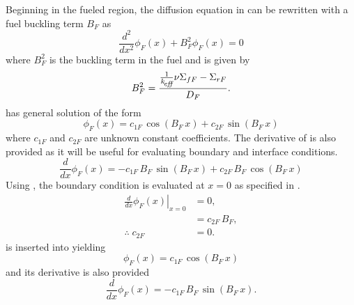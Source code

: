  Beginning in the fueled region, the diffusion equation in  can 
  be rewritten with a fuel buckling term $B_F$ as
  \begin{equation}
    \label{eq:2regF_buckle}
    \frac{d^2}{dx^2} \phi_F(x) + B_F^2 \phi_F(x) = 0 
  \end{equation}
  where $B_F^2$ is the buckling term in the fuel and is given by
  \begin{equation}
    \label{eq:2regF_b2}
    B_F^2 = \frac{\frac{1}{k_{\!\mbox{\scriptsize \em eff}}} \nu \Sigma_{fF} - \Sigma_{rF}}{D_F}.
  \end{equation}
   has general solution of the form
  \begin{equation}
    \label{eq:2regF_general}
    \phi_F(x) = c_{1F} \, \cos(B_F\,x) + c_{2F} \, \sin(B_F\,x)
  \end{equation}
  where $c_{1F}$ and $c_{2F}$ are unknown constant coefficients.
  The derivative of  is also provided as it will be
  useful for evaluating boundary and interface conditions.
  \begin{equation}
    \label{eq:2regF_general_derivative}
    \frac{d}{dx}\phi_F(x) = -c_{1F} \, B_F \, \sin(B_F\,x) + 
      c_{2F} \, B_F \, \cos(B_F\,x)
  \end{equation}
  Using , the boundary condition is evaluated
  at $x=0$ as specified in .
  \begin{align}
    \left. \frac{d}{dx} \phi_F(x) \right|_{x=0} &= 0, \\
    &= c_{2F} \, B_F, \\
    \label{eq:2reg_c2f}
    \therefore \; c_{2F} &= 0.
  \end{align}
   is inserted into  yielding
  \begin{equation}
    \label{eq:2regF_cos}
    \phi_F(x) = c_{1F} \, \cos(B_F\, x)
  \end{equation}
  and its derivative is also provided
  \begin{equation}
    \label{eq:2regF_cos_derivative}
    \frac{d}{dx} \phi_F(x) = -c_{1F} \, B_F \, \sin(B_F \, x).
  \end{equation}

